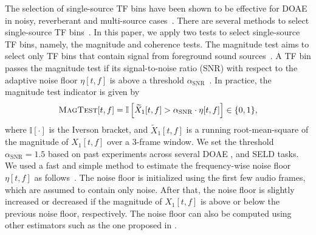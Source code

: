 \documentclass[journal]{IEEEtran}
\begin{document}
The selection of single-source TF bins have been shown to be effective for DOAE in noisy, reverberant and multi-source cases~\cite{Nguyen2014RobustSources, Nguyen2020ADetection, Nguyen2020RobustNetwork}. There are several methods to select single-source TF bins~\cite{Mohan2008LocalizationTest, Pavlidi2013Real-TimeArray, Nguyen2014RobustSources}. In this paper, we apply two tests to select single-source TF bins, namely, the magnitude and coherence tests. The magnitude test aims to select only TF bins that contain signal from foreground sound sources~\cite{Nguyen2014RobustSources}. A TF bin passes the magnitude test if its signal-to-noise ratio (SNR) with respect to the adaptive noise floor $\eta[t, f]$ is above a threshold $\alpha_\text{SNR}$~\cite{Nguyen2014RobustSources}. In practice, the magnitude test indicator is given by
\begin{equation}
    \textsc{MagTest}[t, f] = \mathbb{I}\left[
        \widetilde{X}_1[t,f] > \alpha_\text{SNR} \cdot \eta[t, f]
    \right] \in \{0, 1\},
\end{equation}
where $\mathbb{I}\left[\cdot\right]$ is the Iverson bracket, and $\widetilde{X}_1[t,f]$ is a running root-mean-square of the magnitude of $X_1[t,f]$ over a 3-frame window. We set the threshold $\alpha_\text{SNR}=1.5$ based on past experiments across several DOAE \cite{Nguyen2014RobustSources, Nguyen2020RobustNetwork, Zhao2015RobustReduction}, and SELD \cite{Nguyen2020ADetection, Nguyen2020EnsembleTracking, Nguyen2019DCASEDetection} tasks. We used a fast and simple method to estimate the frequency-wise noise floor $\eta[t, f]$ as follows~\cite{Nguyen2014RobustSources}. The noise floor is initialized using the first few audio frames, which are assumed to contain only noise. After that, the noise floor is slightly increased or decreased if the magnitude of $X_1[t,f]$ is above or below the previous noise floor, respectively. The noise floor can also be computed using other estimators such as the one proposed in \cite{Gerkmann2012UnbiasedDelay}.
\end{document}

